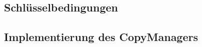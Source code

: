 \subsection{Schlüsselbedingungen}

\subsection{Implementierung des CopyManagers}


%  
%  
%  
% 
% 			
% 				
% 
% 
